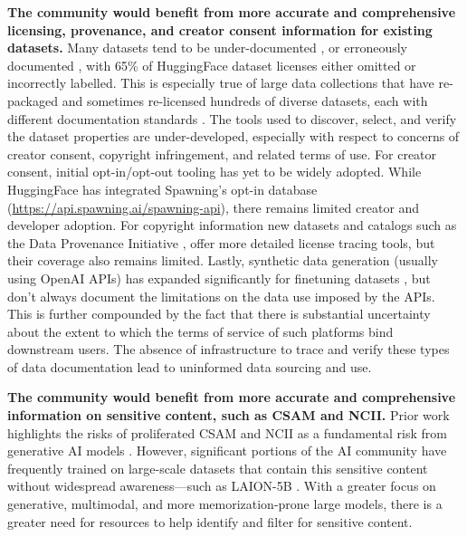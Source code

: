\textbf{The community would benefit from more accurate and comprehensive licensing, provenance, and creator consent information for existing datasets.}
Many datasets tend to be under-documented \citep{bandy2021addressing, sambasivan2021everyone}, or erroneously documented \citep{longpre2023data}, with 65\% of HuggingFace dataset licenses either omitted or incorrectly labelled.
This is especially true of large data collections that have re-packaged and sometimes re-licensed hundreds of diverse datasets, each with different documentation standards \citep{longpre2023flan, sanh2021multitask}.
The tools used to discover, select, and verify the dataset properties are under-developed, especially with respect to concerns of creator consent, copyright infringement, and related terms of use.
For creator consent, initial opt-in/opt-out tooling has yet to be widely adopted.
While HuggingFace has integrated Spawning's opt-in database (\url{https://api.spawning.ai/spawning-api}), there remains limited creator and developer adoption.
For copyright information new datasets and catalogs such as the Data Provenance Initiative \citep{longpre2023data}, offer more detailed license tracing tools, but their coverage also remains limited.
Lastly, synthetic data generation (usually using OpenAI APIs) has expanded significantly for finetuning datasets \citep{longpre2023data}, but don't always document the limitations on the data use imposed by the APIs. This is further compounded by the fact that there is substantial uncertainty about the extent to which the terms of service of such platforms bind downstream users.
The absence of infrastructure to trace and verify these types of data documentation lead to uninformed data sourcing and use.

\textbf{The community would benefit from more accurate and comprehensive information on sensitive content, such as CSAM and NCII.}
Prior work highlights the risks of proliferated CSAM and NCII as a fundamental risk from generative AI models \citep{kapoor2024societal, lakatos-revealing-2023, thiel-generative-2023}.
However, significant portions of the AI community have frequently trained on large-scale datasets that contain this sensitive content without widespread awareness---such as LAION-5B \citep{birhane2021multimodal, David2023AIDatasetCSAM}.
With a greater focus on generative, multimodal, and more memorization-prone large models, there is a greater need for resources to help identify and filter for sensitive content.

